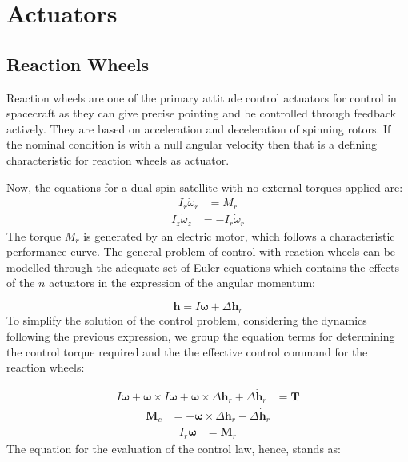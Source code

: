 \section{Actuators}
\subsection{Reaction Wheels}

Reaction wheels are one of the primary attitude control actuators for control in spacecraft as they can give precise pointing and be controlled through feedback actively. They are based on acceleration and deceleration of spinning rotors. If the nominal condition is with a null angular velocity then that is a defining characteristic for reaction wheels as actuator.

Now, the equations for a dual spin satellite with no external torques applied are:
     \begin{align*}
		  I_{r}\dot{\omega}_{r} &= M_{r}
     \end{align*}
     \begin{align*}
	    I_{z}\dot{\omega}_{z} &= -I_{r}\dot{\omega}_{r}
     \end{align*}
The torque \( M_{r} \) is generated by an electric motor, which follows a characteristic performance curve. The general problem of control with reaction wheels can be modelled through the adequate set of Euler equations which contains the effects of the \( n \) actuators in the expression of the angular momentum:

    \begin{equation*}
		\mathbf{h} = I \boldsymbol{\omega} + \Delta \mathbf{h}_r
    \end{equation*}	
To simplify the solution of the control problem, considering the dynamics following the previous expression, we group the equation terms for determining the control torque required and the the effective control command for the reaction wheels:

	\begin{align*}
	I \dot{\boldsymbol{\omega}} + \boldsymbol{\omega} \times I \boldsymbol{\omega} + \boldsymbol{\omega} \times \Delta \mathbf{h}_r + \Delta \dot{\mathbf{h}}_r &= \mathbf{T} 
	\end{align*}
	\begin{align*}
		\mathbf{M}_c &= -\boldsymbol{\omega} \times \Delta \mathbf{h}_r - \Delta \dot{\mathbf{h}}_r
	\end{align*}
	\begin{align*}
			I_r \dot{\boldsymbol{\omega}} &= \mathbf{M}_r 
	\end{align*}
The equation for the evaluation of the control law, hence, stands as:
	
